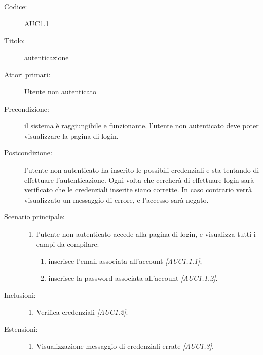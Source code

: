 \documentclass[casi-duso]{subfiles}
\begin{document}
\begin{description}
  \item[Codice:] AUC1.1
  \item[Titolo:] autenticazione
  \item[Attori primari:] Utente non autenticato
  \item[Precondizione:] il sistema è raggiungibile e funzionante, l'utente non autenticato deve poter visualizzare la pagina di login.
  \item[Postcondizione:] l'utente non autenticato ha inserito le possibili credenziali e sta tentando di effettuare l'autenticazione. Ogni volta che cercherà di effettuare
        login sarà verificato che le credenziali inserite siano corrette. In caso contrario verrà visualizzato un messaggio di errore, e l'accesso sarà negato.
  \item[Scenario principale:]
  \begin{enumerate}
    \item  l'utente non autenticato accede alla pagina di login, e visualizza tutti i campi da compilare:
    \begin{enumerate}
      \item inserisce l’email associata all’account \emph{[AUC1.1.1]};
      \item inserisce la password associata all’account \emph{[AUC1.1.2]}.
    \end{enumerate}
  \end{enumerate}
  \item[Inclusioni:]
  \begin{enumerate}
    \item Verifica credenziali \emph{[AUC1.2]}.
  \end{enumerate}
  \item[Estensioni:]
  \begin{enumerate}
    \item Visualizzazione messaggio di credenziali errate \emph{[AUC1.3]}.
  \end{enumerate}
\end{description}
\end{document}

